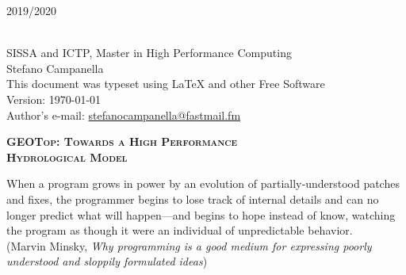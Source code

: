 \null
\vfill


{\large \textsc{2019/2020} }

\endgroup


\clearpage

\thispagestyle{empty}

\vspace*{\fill}

{\small
{} \\
SISSA and ICTP, Master in High Performance Computing \\
Stefano Campanella \\
This document was typeset using \LaTeX{} and other Free Software \\
Version: \today \\
Author's e-mail: \url{stefanocampanella@fastmail.fm}
}

\newpage
\tableofcontents*
\newpage

\thispagestyle{empty}

\begin{center}
{\LARGE
  \textsc{ \bfseries GEOTop: Towards a High Performance\\ Hydrological Model} \par
}
\HRule
\end{center}
\cleardoublepage

\thispagestyle{empty}
\vspace*{\fill}
\begin{flushright}
  \begin{minipage}[t]{0.6\textwidth}
      When a program grows in power by an evolution of partially‑understood patches and fixes, the programmer begins to lose track of internal details and can no longer predict what will happen—and begins to hope instead of know, watching the program as though it were an individual of unpredictable behavior.\\[\baselineskip]
    (Marvin Minsky, \textit{Why programming is a good medium for expressing poorly understood and sloppily formulated ideas})
  \end{minipage}
\end{flushright}
\vspace*{\fill}
\cleardoublepage
